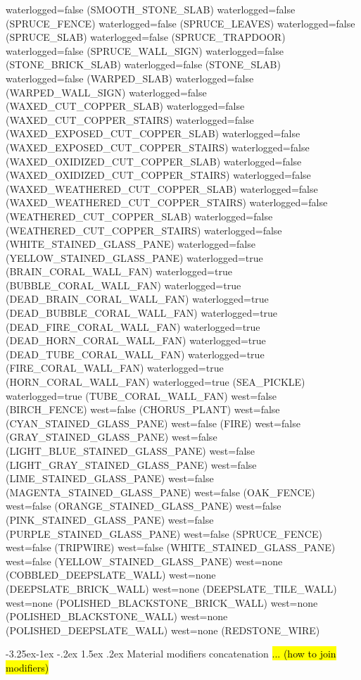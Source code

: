 \documentclass[11pt]{article}
\makeatletter
\renewcommand\subsection{\@startsection{subsection}{2}{\z@}%
                                         {-3.25ex\@plus -1ex \@minus -.2ex}%
                                         {1.5ex \@plus .2ex}%
                                         {\normalfont\fontfamily{phv}\fontsize{14}{17}\bfseries}}
\newcommand\myworries[1]{\sethlcolor{red}\hl{#1}}
\makeatother
\begin{document}
waterlogged=false (SMOOTH_STONE_SLAB)
waterlogged=false (SPRUCE_FENCE)
waterlogged=false (SPRUCE_LEAVES)
waterlogged=false (SPRUCE_SLAB)
waterlogged=false (SPRUCE_TRAPDOOR)
waterlogged=false (SPRUCE_WALL_SIGN)
waterlogged=false (STONE_BRICK_SLAB)
waterlogged=false (STONE_SLAB)
waterlogged=false (WARPED_SLAB)
waterlogged=false (WARPED_WALL_SIGN)
waterlogged=false (WAXED_CUT_COPPER_SLAB)
waterlogged=false (WAXED_CUT_COPPER_STAIRS)
waterlogged=false (WAXED_EXPOSED_CUT_COPPER_SLAB)
waterlogged=false (WAXED_EXPOSED_CUT_COPPER_STAIRS)
waterlogged=false (WAXED_OXIDIZED_CUT_COPPER_SLAB)
waterlogged=false (WAXED_OXIDIZED_CUT_COPPER_STAIRS)
waterlogged=false (WAXED_WEATHERED_CUT_COPPER_SLAB)
waterlogged=false (WAXED_WEATHERED_CUT_COPPER_STAIRS)
waterlogged=false (WEATHERED_CUT_COPPER_SLAB)
waterlogged=false (WEATHERED_CUT_COPPER_STAIRS)
waterlogged=false (WHITE_STAINED_GLASS_PANE)
waterlogged=false (YELLOW_STAINED_GLASS_PANE)
waterlogged=true (BRAIN_CORAL_WALL_FAN)
waterlogged=true (BUBBLE_CORAL_WALL_FAN)
waterlogged=true (DEAD_BRAIN_CORAL_WALL_FAN)
waterlogged=true (DEAD_BUBBLE_CORAL_WALL_FAN)
waterlogged=true (DEAD_FIRE_CORAL_WALL_FAN)
waterlogged=true (DEAD_HORN_CORAL_WALL_FAN)
waterlogged=true (DEAD_TUBE_CORAL_WALL_FAN)
waterlogged=true (FIRE_CORAL_WALL_FAN)
waterlogged=true (HORN_CORAL_WALL_FAN)
waterlogged=true (SEA_PICKLE)
waterlogged=true (TUBE_CORAL_WALL_FAN)
west=false (BIRCH_FENCE)
west=false (CHORUS_PLANT)
west=false (CYAN_STAINED_GLASS_PANE)
west=false (FIRE)
west=false (GRAY_STAINED_GLASS_PANE)
west=false (LIGHT_BLUE_STAINED_GLASS_PANE)
west=false (LIGHT_GRAY_STAINED_GLASS_PANE)
west=false (LIME_STAINED_GLASS_PANE)
west=false (MAGENTA_STAINED_GLASS_PANE)
west=false (OAK_FENCE)
west=false (ORANGE_STAINED_GLASS_PANE)
west=false (PINK_STAINED_GLASS_PANE)
west=false (PURPLE_STAINED_GLASS_PANE)
west=false (SPRUCE_FENCE)
west=false (TRIPWIRE)
west=false (WHITE_STAINED_GLASS_PANE)
west=false (YELLOW_STAINED_GLASS_PANE)
west=none (COBBLED_DEEPSLATE_WALL)
west=none (DEEPSLATE_BRICK_WALL)
west=none (DEEPSLATE_TILE_WALL)
west=none (POLISHED_BLACKSTONE_BRICK_WALL)
west=none (POLISHED_BLACKSTONE_WALL)
west=none (POLISHED_DEEPSLATE_WALL)
west=none (REDSTONE_WIRE)

\subsection{Material modifiers concatenation}
\myworries{... (how to join modifiers)}



	
\end{document}
